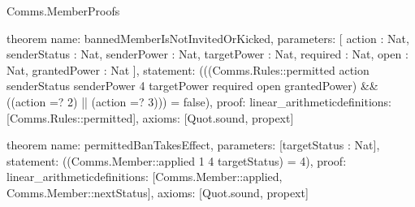 \begin{lexlean}{Comms.MemberProofs}
\begin{semanticmodule}
theorem{
  name: bannedMemberIsNotInvitedOrKicked,
  parameters: [
    action : Nat,
    senderStatus : Nat,
    senderPower : Nat,
    targetPower : Nat,
    required : Nat,
    open : Nat,
    grantedPower : Nat
  ],
  statement: (((Comms.Rules::permitted action senderStatus senderPower 4 targetPower required open grantedPower) && ((action =? 2) || (action =? 3))) = false),
  proof: linear_arithmetic{definitions: [Comms.Rules::permitted]},
  axioms: [Quot.sound, propext]
}

theorem{
  name: permittedBanTakesEffect,
  parameters: [targetStatus : Nat],
  statement: ((Comms.Member::applied 1 4 targetStatus) = 4),
  proof: linear_arithmetic{definitions: [Comms.Member::applied, Comms.Member::nextStatus]},
  axioms: [Quot.sound, propext]
}
\end{semanticmodule}
\end{lexlean}
